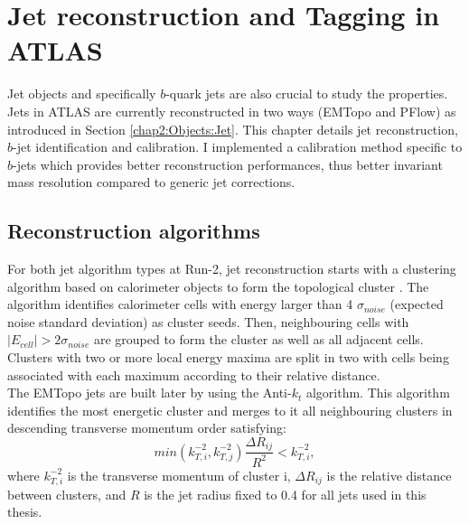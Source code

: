 \newpage
\chapter{Jet reconstruction and Tagging in ATLAS}
\label{Jet}
Jet objects and specifically $b$-quark jets are also crucial to study the \HHyybb properties. Jets in ATLAS are currently reconstructed in two ways (EMTopo and PFlow) as introduced in Section \ref{chap2:Objects:Jet}. This chapter details jet reconstruction, $b$-jet identification and calibration. I implemented a calibration method specific to $b$-jets which provides better reconstruction performances, thus better \mbb invariant mass resolution compared to generic jet corrections.

\section{Reconstruction algorithms}
\label{Jet:JR}
For both jet algorithm types at Run-2, jet reconstruction starts with a clustering algorithm based on calorimeter objects to form the topological cluster \cite{Jet_Algo_Perf}. The algorithm identifies calorimeter cells with energy larger than 4 $\sigma_{noise}$ (expected noise standard deviation) as cluster seeds. Then, neighbouring cells with $|E_{cell}| > 2\sigma_{noise}$ are grouped to form the cluster as well as all adjacent cells. Clusters with two or more local energy maxima are split in two with cells being associated with each maximum according to their relative distance. \\
The EMTopo jets are built later by using the Anti-$k_t$ algorithm. This algorithm identifies the most energetic cluster and merges to it all neighbouring clusters in descending transverse momentum order satisfying:
\begin{equation}
    min(k_{T,i}^{-2}, k_{T,j}^{-2}) \frac{\Delta R_{ij}}{R^2} < k_{T,i}^{-2},
\end{equation}
where $k_{T,i}^{-2}$ is the transverse momentum of cluster i, $\Delta R_{ij}$ is the relative distance between clusters, and $R$ is the jet radius fixed to 0.4 for all jets used in this thesis. \\
